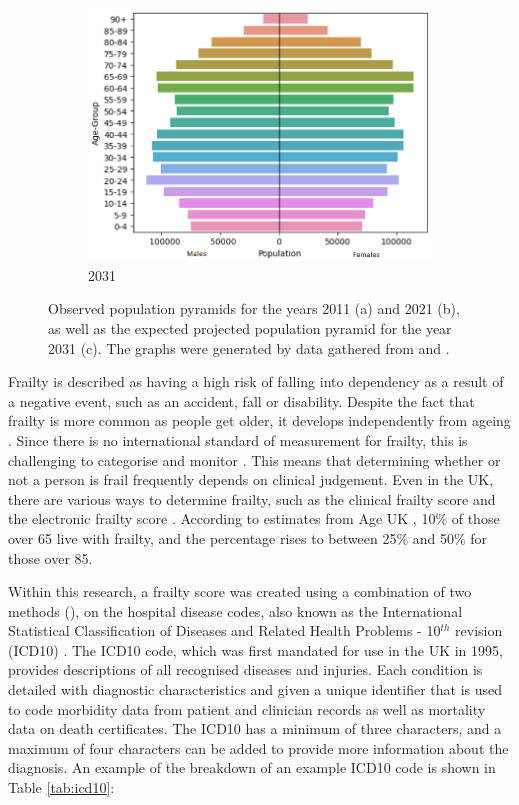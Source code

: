 \documentclass[../thesis.tex]{subfiles}
\begin{document}
\begin{figure}[h!]
\begin{subfigure}{0.33\textwidth}
    \includegraphics[width=\textwidth]{Chapters/Chapter1/Figures/Census2031a.png}
    \caption{2031}
\end{subfigure}
    \caption{Observed population pyramids for the years 2011 (a) and 2021 (b), as well as the expected projected population pyramid for the year 2031 (c). The graphs were generated by data gathered from \cite{StatsWalespp1} and \cite{StatsWalespp2}.}
    \label{fig:PopulationPyramids}
\end{figure}

Frailty is described as having a high risk of falling into dependency as a result of a negative event, such as an accident, fall or disability. Despite the fact that frailty is more common as people get older, it develops independently from ageing \cite{Topinkova2008}. Since there is no international standard of measurement for frailty, this is challenging to categorise and monitor \cite{Dent2016}. This means that determining whether or not a person is frail frequently depends on clinical judgement. Even in the UK, there are various ways to determine frailty, such as the clinical frailty score \cite{Rockwood2005} and the electronic frailty score \cite{NHSEnglanda}. According to estimates from Age UK \cite{AgeUK2020}, 10\% of those over 65 live with frailty, and the percentage rises to between 25\% and 50\% for those over 85.

Within this research, a frailty score was created using a combination of two methods (\cite{Gilbert2018, Soong2015}), on the hospital disease codes, also known as the International Statistical Classification of Diseases and Related Health Problems - 10$^{th}$ revision (ICD10) \cite{NHSWales, WHOICD}. The ICD10 code, which was first mandated for use in the UK in 1995, provides descriptions of all recognised diseases and injuries. Each condition is detailed with diagnostic characteristics and given a unique identifier that is used to code morbidity data from patient and clinician records as well as mortality data on death certificates. The ICD10 has a minimum of three characters, and a maximum of four characters can be added to provide more information about the diagnosis. An example of the breakdown of an example ICD10 code is shown in Table \ref{tab:icd10}:
\end{document}
